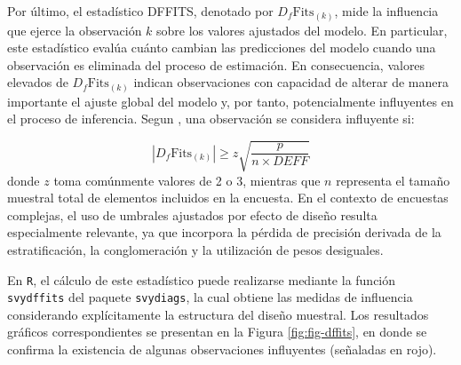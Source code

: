 \documentclass[
  spanish,
  12pt,
]{book}
\begin{document}
Por último, el estadístico DFFITS, denotado por \(D_f\text{Fits}_{(k)}\), mide la influencia que ejerce la observación \(k\) sobre los valores ajustados del modelo. En particular, este estadístico evalúa cuánto cambian las predicciones del modelo cuando una observación es eliminada del proceso de estimación. En consecuencia, valores elevados de \(D_f\text{Fits}_{(k)}\) indican observaciones con capacidad de alterar de manera importante el ajuste global del modelo y, por tanto, potencialmente influyentes en el proceso de inferencia. Segun \citet{Li_Valliant_2015}, una observación se considera influyente si:

\[
|D_f\text{Fits}_{(k)}| \geq z\sqrt{\frac{p}{n\times DEFF}}
\]
donde \(z\) toma comúnmente valores de 2 o 3, mientras que \(n\) representa el tamaño muestral total de elementos incluidos en la encuesta. En el contexto de encuestas complejas, el uso de umbrales ajustados por efecto de diseño resulta especialmente relevante, ya que incorpora la pérdida de precisión derivada de la estratificación, la conglomeración y la utilización de pesos desiguales.

En \texttt{R}, el cálculo de este estadístico puede realizarse mediante la función \texttt{svydffits} del paquete \texttt{svydiags}, la cual obtiene las medidas de influencia considerando explícitamente la estructura del diseño muestral. Los resultados gráficos correspondientes se presentan en la Figura \ref{fig:fig-dffits}, en donde se confirma la existencia de algunas observaciones influyentes (señaladas en rojo).
\end{document}
